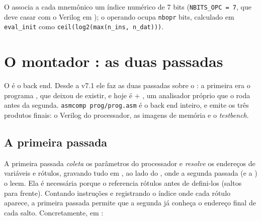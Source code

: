 O  associa a cada mnemônico um índice numérico de 7 bits
(\lstinline|NBITS_OPC = 7|, que deve casar com o Verilog em ); o
operando ocupa \lstinline|nbopr| bits, calculado em \lstinline|eval_init| como
\lstinline|ceil(log2(max(n_ins, n_dat)))|.

\section{O montador : as duas passadas}
\label{sec:yanc-asmcomp}

O  é o back end. Desde a v7.1 ele faz as duas passadas sobre o
: a primeira era o programa , que deixou de existir, e
hoje é  + , um analisador próprio que o
 roda antes da segunda. \lstinline|asmcomp prog/prog.asm| é o back
end inteiro, e emite os três produtos finais: o Verilog do processador, as
imagens de memória  e o \emph{testbench}.

\subsection{A primeira passada}
\label{sec:yanc-appcomp}

A primeira passada \emph{coleta} os parâmetros do processador e \emph{resolve} os
endereços de variáveis e rótulos, gravando tudo em , ao lado do
, onde a segunda passada (e a ) o leem. Ela é necessária
porque o  referencia rótulos antes de defini-los (saltos para frente).
Contando instruções e registrando o índice onde cada rótulo aparece, a primeira
passada permite que a segunda já conheça o endereço final de cada salto.
Concretamente, em :

